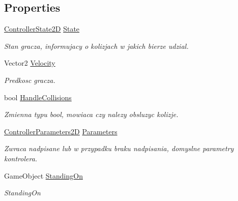 \subsection*{Properties}
\begin{DoxyCompactItemize}
\item 
\hyperlink{class_controller_state2_d}{Controller\+State2\+D} \hyperlink{class_character_controller2_d_a5e65ffc5d4f73920480727f2bf58e978}{State}
\begin{DoxyCompactList}\small\item\em Stan gracza, informujacy o kolizjach w jakich bierze udzial. \end{DoxyCompactList}\item 
Vector2 \hyperlink{class_character_controller2_d_af48e21d4114c7f48f97fe924956b3d10}{Velocity}
\begin{DoxyCompactList}\small\item\em Predkosc gracza. \end{DoxyCompactList}\item 
bool \hyperlink{class_character_controller2_d_aa693a23e691347cf526060141fad519e}{Handle\+Collisions}
\begin{DoxyCompactList}\small\item\em Zmienna typu bool, mowiaca czy nalezy obsluzyc kolizje. \end{DoxyCompactList}\item 
\hyperlink{class_controller_parameters2_d}{Controller\+Parameters2\+D} \hyperlink{class_character_controller2_d_a408542bab9592c3d0d4ca432a5775ce6}{Parameters}
\begin{DoxyCompactList}\small\item\em Zwraca nadpisane lub w przypadku braku nadpisania, domyslne parametry kontrolera. \end{DoxyCompactList}\item 
Game\+Object \hyperlink{class_character_controller2_d_ae2f301ab8f2d3b4290a2780d021e44fb}{Standing\+On}
\begin{DoxyCompactList}\small\item\em Standing\+On \end{DoxyCompactList}\item 

\end{DoxyCompactItemize}
